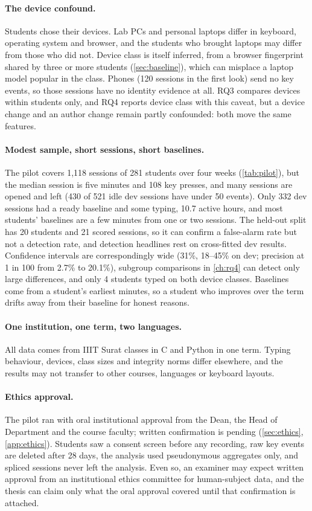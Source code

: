 \paragraph{The device confound.} Students chose their devices. Lab PCs and
personal laptops differ in keyboard, operating system and browser, and the
students who brought laptops may differ from those who did not. Device class is
itself inferred, from a browser fingerprint shared by three or more students
(\cref{sec:baseline}), which can misplace a laptop model popular in the class.
Phones (120 sessions in the first look) send no key events, so those sessions
have no identity evidence at all. RQ3 compares devices within students only,
and RQ4 reports device class with this caveat, but a device change and an
author change remain partly confounded: both move the same features.

\paragraph{Modest sample, short sessions, short baselines.} The pilot covers
1,118 sessions of 281 students over four weeks (\cref{tab:pilot}), but the median
session is five minutes and 108 key presses, and many sessions are opened and
left (430 of 521 idle dev sessions have under 50 events). Only 332 dev sessions
had a ready baseline and some typing, 10.7 active hours, and most students'
baselines are a few minutes from one or two sessions. The held-out split
has 20 students and 21 scored sessions, so it can confirm a false-alarm rate but
not a detection rate, and detection headlines rest on cross-fitted dev results.
Confidence intervals are correspondingly wide (31\%, 18--45\% on dev; precision
at 1 in 100 from 2.7\% to 20.1\%), subgroup comparisons in \cref{ch:rq4} can
detect only large differences, and only 4 students typed on both device classes. Baselines come from a student's
earliest minutes, so a student who improves over the term drifts away from
their baseline for honest reasons.

\paragraph{One institution, one term, two languages.} All data comes from IIIT
Surat classes in C and Python in one term.
Typing behaviour, devices, class sizes and integrity norms differ elsewhere, and
the results may not transfer to other courses, languages or keyboard layouts.

\paragraph{Ethics approval.} The pilot ran with oral institutional approval from
the Dean, the Head of Department and the course faculty; written confirmation is
pending (\cref{sec:ethics}, \cref{app:ethics}). Students saw a consent screen
before any recording, raw key events are deleted after 28 days, the analysis
used pseudonymous aggregates only, and spliced sessions never left the analysis.
Even so, an examiner may expect written approval from an institutional ethics
committee for human-subject data, and the thesis can claim only what the oral
approval covered until that confirmation is attached.

